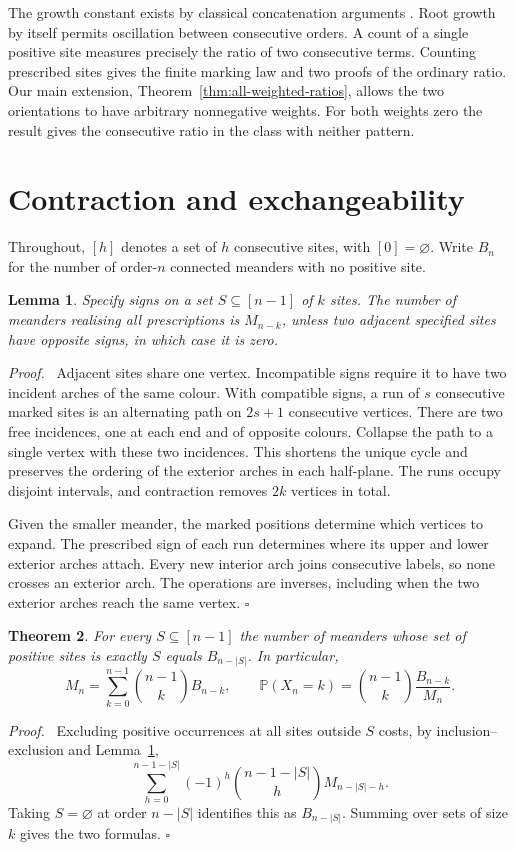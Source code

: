 \documentclass[11pt]{article}
\newtheorem{theorem}{Theorem}
\newtheorem{lemma}[theorem]{Lemma}
\newenvironment{proof}{\par\noindent\textit{Proof.}\ }{\unskip\nobreak\hfill\(\square\)\par}
\newcommand{\Prb}{\mathbb P}
\newcommand{\bin}[2]{\binom{#1}{#2}}
\begin{document}
The growth constant exists by classical concatenation arguments
\cite{AP}. Root growth by itself permits oscillation between consecutive
orders. A count of a single positive site measures precisely the ratio
of two consecutive terms. Counting prescribed sites gives the finite marking law and two
proofs of the ordinary ratio. Our main extension, Theorem~\ref{thm:all-weighted-ratios},
allows the two orientations to have arbitrary nonnegative weights.
For both weights zero the result gives the consecutive ratio in the
class with neither pattern.

\section{Contraction and exchangeability}
Throughout, \([h]\) denotes a set of \(h\) consecutive sites, with
\([0]=\varnothing\). Write \(B_n\) for the number of order-\(n\)
connected meanders with no positive site.

\begin{lemma}\label{lem:contract}
Specify signs on a set \(S\subseteq[n-1]\) of \(k\) sites. The number
of meanders realising all prescriptions is \(M_{n-k}\), unless two
adjacent specified sites have opposite signs, in which case it is zero.
\end{lemma}
\begin{proof}
Adjacent sites share one vertex. Incompatible signs require it to have
two incident arches of the same colour. With compatible signs, a run of
\(s\) consecutive marked sites is an alternating path on \(2s+1\)
consecutive vertices. There are two free incidences, one at each end
and of opposite colours. Collapse the path to a single vertex with
these two incidences. This shortens the unique cycle and preserves the
ordering of the exterior arches in each half-plane. The runs occupy
disjoint intervals, and contraction removes \(2k\) vertices in total.

Given the smaller meander, the marked positions determine which vertices
to expand. The prescribed sign of each run determines where its upper
and lower exterior arches attach. Every new interior arch joins
consecutive labels, so none crosses an exterior arch. The operations
are inverses, including when the two exterior arches reach the same vertex.
\end{proof}

\begin{theorem}\label{thm:law}
For every \(S\subseteq[n-1]\) the number of meanders whose set of
positive sites is \emph{exactly} \(S\) equals \(B_{n-|S|}\). In
particular,
\begin{equation}\label{eq:bin}
 M_n=\sum_{k=0}^{n-1}\bin{n-1}{k}B_{n-k},\qquad
 \Prb(X_n=k)=\bin{n-1}{k}\frac{B_{n-k}}{M_n}.
\end{equation}
\end{theorem}
\begin{proof}
Excluding positive occurrences at all sites outside \(S\) costs, by
inclusion--exclusion and Lemma~\ref{lem:contract},
\[
  \sum_{h=0}^{n-1-|S|}(-1)^h\bin{n-1-|S|}{h}M_{n-|S|-h}.
\]
Taking \(S=\varnothing\) at order \(n-|S|\) identifies this as
\(B_{n-|S|}\). Summing over sets of size \(k\) gives the two formulas.
\end{proof}
\end{document}
